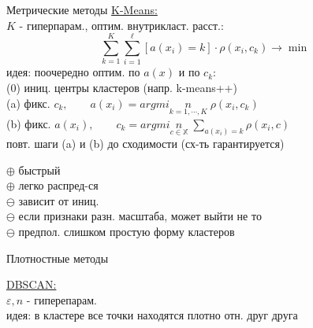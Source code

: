 \documentclass[final]{beamer}
\newlength{\colwidth}
\begin{document}
\begin{frame}[t]
\begin{columns}[t]
\begin{column}{\colwidth}
\begin{block}{Метрические методы}
\underline{\small K-Means:}\\
$K$ - {\small гиперпарам., оптим. внутрикласт. расст.:}
\[\sum\limits_{k = 1}^K \sum\limits_{i = 1}^{\ell} [a(x_i) = k] \cdot \rho(x_i, c_k) \to \min \]
{\small идея: поочередно оптим. по } $a(x)$ {\small и по } $c_k$:\\
\textcolor{mgr}{\small (0)} {\small иниц. центры кластеров (напр. k-means++)}\\
\textcolor{mgr}{\small (a)} {\small фикс. } $c_k, \quad \quad a(x_i) = argmin\limits_{k = 1, \cdots, K} \; \rho(x_i, c_k)$\\
\textcolor{mgr}{\small (b)} {\small фикс. } $a(x_i), \quad \quad c_k = argmin\limits_{c \in \mathbb{X}} \; \sum\limits_{a(x_i) = k} \rho(x_i, c)$\\
{\small повт. шаги \textcolor{mgr}{(a)} и \textcolor{mgr}{(b)} до сходимости (сх-ть гарантируется)}

$\oplus$ {\small быстрый}\\
$\oplus$ {\small легко распред-ся}\\
$\ominus$ {\small зависит от иниц.}\\
$\ominus$ {\small если признаки разн. масштаба, может выйти не то}\\
$\ominus$ {\small предпол. слишком простую форму кластеров}  
\end{block}
\begin{block}{Плотностные методы}

\underline{\small DBSCAN:}\\
$\varepsilon, n$ - {\small гиперепарам.}\\
{\small идея: в кластере все точки находятся плотно отн. друг друга}


\end{block}
\end{column}
\end{columns}
\end{frame}
\end{document}
